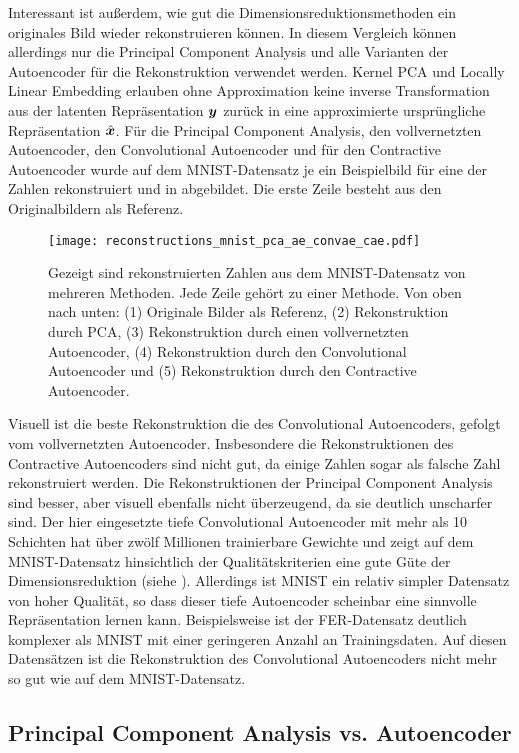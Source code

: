 Interessant ist außerdem, wie gut die Dimensionsreduktionsmethoden ein originales Bild wieder
rekonstruieren können. In diesem Vergleich können allerdings nur die Principal Component Analysis
und alle Varianten der Autoencoder für die Rekonstruktion verwendet werden. Kernel PCA und Locally
Linear Embedding erlauben ohne Approximation keine inverse Transformation aus der latenten
Repräsentation $\bm{y}$ zurück in eine approximierte ursprüngliche Repräsentation
$\hat{\bm{x}}$. Für die Principal Component Analysis, den vollvernetzten Autoencoder, den
Convolutional Autoencoder und für den Contractive Autoencoder wurde auf dem MNIST-Datensatz je ein
Beispielbild für eine der Zahlen rekonstruiert und in 
abgebildet. Die erste Zeile besteht aus den Originalbildern als Referenz.
\begin{figure}[ht]
	\centering
	\texttt{[image: reconstructions\_mnist\_pca\_ae\_convae\_cae.pdf]}
	\caption[Rekonstruierte MNIST-Zahlen]{Gezeigt sind rekonstruierten Zahlen aus dem MNIST-Datensatz von mehreren Methoden. Jede Zeile gehört zu einer Methode. Von oben nach unten: (1) Originale Bilder als Referenz, (2) Rekonstruktion durch PCA, (3) Rekonstruktion durch einen vollvernetzten Autoencoder, (4) Rekonstruktion durch den Convolutional Autoencoder und (5) Rekonstruktion durch den Contractive Autoencoder.}
	\label{fig:MNIST-reconstructions}
\end{figure}
Visuell ist die beste Rekonstruktion die des Convolutional Autoencoders, gefolgt vom vollvernetzten Autoencoder. Insbesondere die Rekonstruktionen des Contractive Autoencoders sind nicht gut, da einige Zahlen sogar als falsche Zahl rekonstruiert werden. Die Rekonstruktionen der Principal Component Analysis sind besser, aber visuell ebenfalls nicht überzeugend, da sie deutlich unscharfer sind. Der hier eingesetzte tiefe Convolutional Autoencoder mit mehr als 10 Schichten hat über zwölf Millionen trainierbare Gewichte und zeigt auf dem MNIST-Datensatz hinsichtlich der Qualitätskriterien eine gute Güte der Dimensionsreduktion (siehe ). Allerdings ist MNIST ein relativ simpler Datensatz von hoher Qualität, so dass dieser tiefe Autoencoder scheinbar eine sinnvolle Repräsentation lernen kann. Beispielsweise ist der FER-Datensatz deutlich komplexer als MNIST mit einer geringeren Anzahl an Trainingsdaten. Auf diesen Datensätzen ist die Rekonstruktion des Convolutional Autoencoders nicht mehr so gut wie auf dem MNIST-Datensatz.

\subsection{Principal Component Analysis vs. Autoencoder}
\label{ch:Vergleich:sec:Resultate:PCA_AE}

